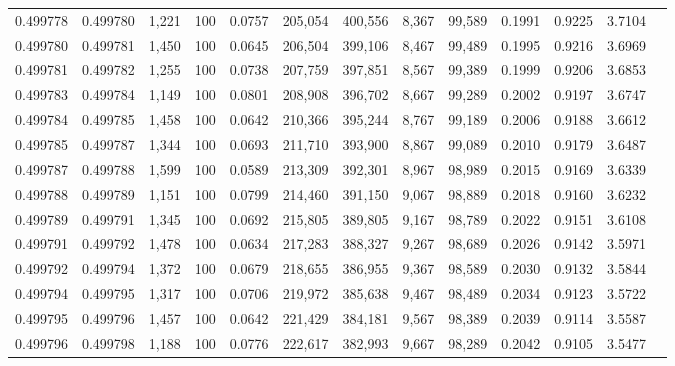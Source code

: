 \begin{tabular}{rrrrrrrrrrrrr}
0.499778 & 0.499780 & 1,221 & 100 &                                     0.0757 & 205,054 & 400,556 &   8,367 &  99,589 & 0.1991 & 0.9225 & 3.7104 \\
0.499780 & 0.499781 & 1,450 & 100 &                                     0.0645 & 206,504 & 399,106 &   8,467 &  99,489 & 0.1995 & 0.9216 & 3.6969 \\
0.499781 & 0.499782 & 1,255 & 100 &                                     0.0738 & 207,759 & 397,851 &   8,567 &  99,389 & 0.1999 & 0.9206 & 3.6853 \\
0.499783 & 0.499784 & 1,149 & 100 &                                     0.0801 & 208,908 & 396,702 &   8,667 &  99,289 & 0.2002 & 0.9197 & 3.6747 \\
0.499784 & 0.499785 & 1,458 & 100 &                                     0.0642 & 210,366 & 395,244 &   8,767 &  99,189 & 0.2006 & 0.9188 & 3.6612 \\
0.499785 & 0.499787 & 1,344 & 100 &                                     0.0693 & 211,710 & 393,900 &   8,867 &  99,089 & 0.2010 & 0.9179 & 3.6487 \\
0.499787 & 0.499788 & 1,599 & 100 &                                     0.0589 & 213,309 & 392,301 &   8,967 &  98,989 & 0.2015 & 0.9169 & 3.6339 \\
0.499788 & 0.499789 & 1,151 & 100 &                                     0.0799 & 214,460 & 391,150 &   9,067 &  98,889 & 0.2018 & 0.9160 & 3.6232 \\
0.499789 & 0.499791 & 1,345 & 100 &                                     0.0692 & 215,805 & 389,805 &   9,167 &  98,789 & 0.2022 & 0.9151 & 3.6108 \\
0.499791 & 0.499792 & 1,478 & 100 &                                     0.0634 & 217,283 & 388,327 &   9,267 &  98,689 & 0.2026 & 0.9142 & 3.5971 \\
0.499792 & 0.499794 & 1,372 & 100 &                                     0.0679 & 218,655 & 386,955 &   9,367 &  98,589 & 0.2030 & 0.9132 & 3.5844 \\
0.499794 & 0.499795 & 1,317 & 100 &                                     0.0706 & 219,972 & 385,638 &   9,467 &  98,489 & 0.2034 & 0.9123 & 3.5722 \\
0.499795 & 0.499796 & 1,457 & 100 &                                     0.0642 & 221,429 & 384,181 &   9,567 &  98,389 & 0.2039 & 0.9114 & 3.5587 \\
0.499796 & 0.499798 & 1,188 & 100 &                                     0.0776 & 222,617 & 382,993 &   9,667 &  98,289 & 0.2042 & 0.9105 & 3.5477 \\

\end{tabular}
